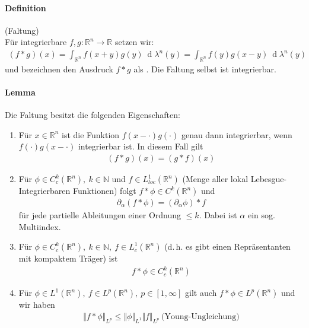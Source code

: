 \documentclass[12pt,a4paper,fleqn]{article}
\def\d{{\operatorname{d}}}
\begin{document}
\paragraph{Definition} (Faltung)\\
Für integrierbare $f, g\colon \mathbb{R}^n \rightarrow \mathbb{R}$ setzen wir:
\begin{align*}
(f * g)(x) = \int_{\mathbb{R}^n} f(x + y)g(y)\ \d\lambda^n(y) = \int_{\mathbb{R}^n} f(y)g(x  - y)\ \d\lambda^n(y)
\end{align*}
und bezeichnen den Ausdruck $f * g$ als . Die Faltung selbst ist integrierbar.

\paragraph{Lemma} Die Faltung besitzt die folgenden Eigenschaften:
\begin{enumerate}
\item Für $x \in \mathbb{R}^n$ ist die Funktion $f(x  - \cdot)g(\cdot)$ genau dann integrierbar, wenn $f(\cdot)g(x - \cdot)$ integrierbar ist. In diesem Fall gilt 
\begin{align*}
(f * g)(x) = (g*f)(x)
\end{align*}
\item Für $\phi \in C^k_c(\mathbb{R}^n),\ k \in \mathbb{N}$ und $f \in L^1_{loc}(\mathbb{R}^n)$ (Menge aller lokal Lebesgue-Integrierbaren Funktionen) folgt $f * \phi \in C^k(\mathbb{R}^n)$ und 
\begin{align*}
\partial_\alpha (f * \phi) = (\partial_\alpha \phi) * f
\end{align*}
für jede partielle Ableitungen einer Ordnung $\leq k$. Dabei ist $\alpha$ ein sog. Multiindex.
\item Für $\phi \in C^k_c (\mathbb{R}^n),\ k \in \mathbb{N},\ f \in L^1_c(\mathbb{R}^n)$ (d.\,h. es gibt einen Repräsentanten mit kompaktem Träger) ist
\begin{align*}
f * \phi \in C^k_c(\mathbb{R}^n)
\end{align*}
\item Für $\phi \in L^1(\mathbb{R}^n),\ f\in L^p(\mathbb{R}^n),\ p \in [1, \infty]$ gilt auch $f * \phi \in L^p(\mathbb{R}^n)$ und wir haben
\begin{align*}
\Vert f * \phi \Vert_{L^p} \leq \Vert \phi \Vert_{L^1} \Vert f \Vert_{L^p}\ \text{(Young-Ungleichung)}
\end{align*}
\end{enumerate}
\end{document}

